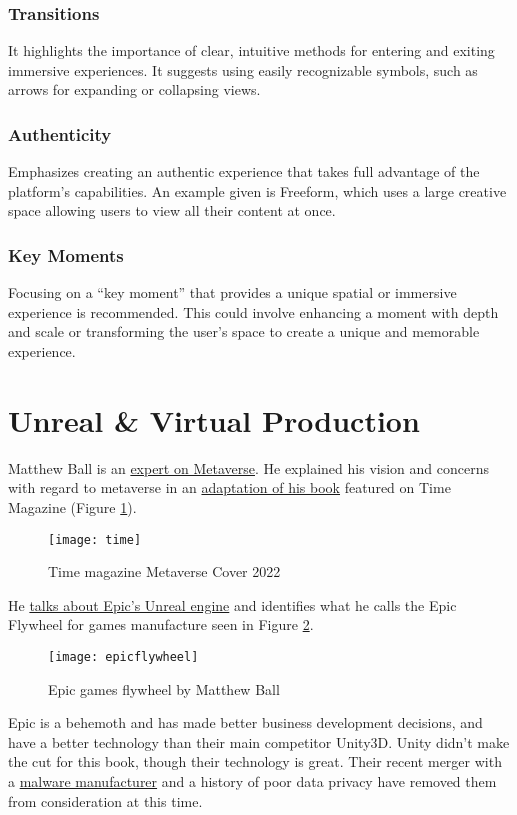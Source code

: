 \subsubsection{Transitions}
It highlights the importance of clear, intuitive methods for entering and exiting immersive experiences. It suggests using easily recognizable symbols, such as arrows for expanding or collapsing views.
\subsubsection{Authenticity}
Emphasizes creating an authentic experience that takes full advantage of the platform's capabilities. An example given is Freeform, which uses a large creative space allowing users to view all their content at once.
\subsubsection{Key Moments}
Focusing on a ``key moment'' that provides a unique spatial or immersive experience is recommended. This could involve enhancing a moment with depth and scale or transforming the user's space to create a unique and memorable experience.
\section{Unreal \& Virtual Production}
Matthew Ball is an \href{https://www.matthewball.vc/}{expert on Metaverse}. He explained his vision and concerns with regard to metaverse in an \href{https://time.com/6197849/metaverse-future-matthew-ball/}{adaptation of his book}\cite{ball2020metaverse} featured on Time Magazine (Figure \ref{fig:time}).\par
\begin{figure}
  \centering
    \texttt{[image: time]}
  \caption{Time magazine Metaverse Cover 2022}
  \label{fig:time}
\end{figure}
He \href{https://www.matthewball.vc/all/epicprimer1}{talks about Epic's Unreal engine} and identifies what he calls the Epic Flywheel for games manufacture seen in Figure \ref{fig:epicflywheel}.\par
\begin{figure}
  \centering
    \texttt{[image: epicflywheel]}
  \caption{Epic games flywheel by Matthew Ball}
  \label{fig:epicflywheel}
\end{figure}
Epic is a behemoth and has made better business development decisions, and have a better technology than their main competitor Unity3D. Unity didn't make the cut for this book, though their technology is great. Their recent merger with a \href{https://www.pcgamer.com/unity-is-merging-with-a-company-who-made-a-malware-installer/}{malware manufacturer} and a history of poor data privacy have removed them from consideration at this time.
